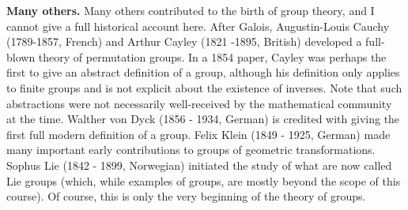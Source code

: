 \documentclass[11pt, reqno]{amsart}
\theoremstyle{remark}
\numberwithin{equation}{subsection}
\numberwithin{figure}{section}
\numberwithin{table}{section}
\newcommand{\sss}{\vspace{2.5 mm}}
\begin{document}
\sss

\textbf{Many others.} Many others contributed to the birth of group theory, and I cannot give a full historical account here. After Galois, Augustin-Louis Cauchy (1789-1857, French) and Arthur Cayley (1821 -1895, British) developed a full-blown theory of permutation groups. 
In a 1854 paper, Cayley was perhaps the first to give an abstract definition of a group, although his definition only applies to finite groups and is not explicit about the existence of inverses. Note that such abstractions were not necessarily well-received by the mathematical community at the time. Walther von Dyck (1856 - 1934, German) is credited with giving the first full modern definition of a group.
Felix Klein (1849 - 1925, German) made many important early contributions to groups of geometric transformations.
Sophus Lie (1842 - 1899, Norwegian) initiated the study of what are now called Lie groups (which, while examples of groups, are mostly beyond the scope of this course).
Of course, this is only the very beginning of the theory of groups.



























	




  
\end{document}
